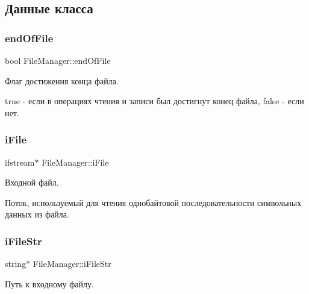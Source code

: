 \subsection{Данные класса}
\hypertarget{class_file_manager_ae43001594f1ee182581741d2530620a8}{}\label{class_file_manager_ae43001594f1ee182581741d2530620a8} 
\subsubsection{\texorpdfstring{end\+Of\+File}{endOfFile}}
{\footnotesize\ttfamily bool File\+Manager\+::end\+Of\+File\hspace{0.3cm}{\ttfamily [private]}}



Флаг достижения конца файла. 

true -\/ если в операциях чтения и записи был достигнут конец файла, false -\/ если нет. \hypertarget{class_file_manager_a91fd33cbb230ed4974a678302e906a8d}{}\label{class_file_manager_a91fd33cbb230ed4974a678302e906a8d} 
\subsubsection{\texorpdfstring{i\+File}{iFile}}
{\footnotesize\ttfamily ifstream$\ast$ File\+Manager\+::i\+File\hspace{0.3cm}{\ttfamily [private]}}



Входной файл. 

Поток, используемый для чтения однобайтовой последовательности символьных данных из файла. \hypertarget{class_file_manager_aaa0e6feed45b6a92ce5c0b509bd9ceb6}{}\label{class_file_manager_aaa0e6feed45b6a92ce5c0b509bd9ceb6} 
\subsubsection{\texorpdfstring{i\+File\+Str}{iFileStr}}
{\footnotesize\ttfamily string$\ast$ File\+Manager\+::i\+File\+Str\hspace{0.3cm}{\ttfamily [private]}}



Путь к входному файлу. 

